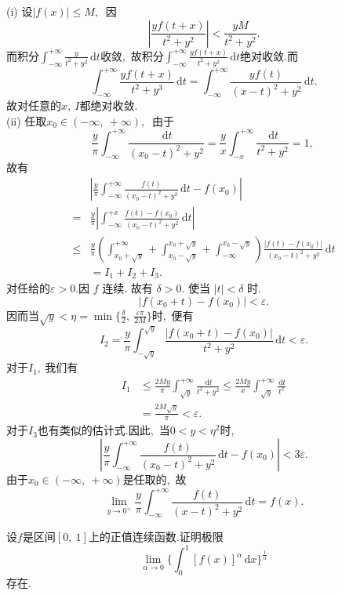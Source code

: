 	\begin{solution}
		(i) 设$  |f(x)| \leqslant M ,\ $ 因
		$$\left|\frac{y f(t+x)}{t^{2}+y^{2}}\right|<\frac{y M}{t^{2}+y^{2}} .$$
		而积分$\int_{-\infty}^{+\infty}\frac{y}{t^2+y^2}\,\text{d}t$收敛,\ 故积分$\int_{-\infty}^{+\infty}\frac{yf(t+x)}{t^2+y^2}\,\text{d}t$绝对收敛.而
		$$\int_{-\infty}^{+\infty} \frac{y f(t+x)}{t^{2}+y^{3}} \,\text{d} t=\int_{-\infty}^{+\infty} \frac{y f(t)}{(x-t)^{2}+y^{2}} \,\text{d} t .$$
		故对任意的$x,\ I$都绝对收敛.\\
		(ii) 任取$  x_{0} \in(-\infty,\ +\infty) ,\ $ 由于
		$$\frac{y}{\pi} \int_{-\infty}^{+\infty} \frac{\,\text{d} t}{\left(x_{0}-t\right)^{2}+y^{2}}=\frac{y}{x} \int_{-x}^{+\infty} \frac{\,\text{d} t}{t^{2}+y^{2}}=1,\ $$
		故有
		$$\begin{aligned}
			&\left|\frac{y}{\pi} \int_{-\infty}^{+\infty} \frac{f(t)}{\left(x_{0}-t\right)^{2}+y^{2}} \,\text{d} t-        
			f\left(x_{0}\right)\right|\\
			=&\frac{y}{\pi}\left|\int_{-\infty}^{+x} \frac{f(t)-f\left(x_{0}\right)}{\left(x_{0}-t\right)^{2}+y^{2}} \,\text{d} t\right| \\
			\leqslant& \frac{y}{\pi}\left(\int_{x_{0}+\sqrt{y}}^{+\infty}+\int_{x_{0}-\sqrt{y}}^{x_{0}+\sqrt{y}}+\int_{-\infty}^{x_{0}-\sqrt{y}}\right) \frac{\left|f(t)-f\left(x_{0}\right)\right|}{\left(x_{0}-t\right)^{2}+y^{2}} \,\text{d} t \\
			&=I_{1}+I_{2}+I_{3} .
		\end{aligned}$$
		对任给的$  \varepsilon>0 . $因 $ f $ 连续. 故有  $\delta>0 .$ 使当  $|t|<\delta $ 时.
		$$\left|f\left(x_{0}+t\right)-f\left(x_{0}\right)\right|<\varepsilon .$$
		因而当$\sqrt{y}<\eta=\min\{\frac{\delta}{2},\ \frac{\varepsilon\pi}{2M}\}$时,\ 便有
		$$I_{2}=\frac{y}{\pi} \int_{-\sqrt{y}}^{\sqrt{y}} \frac{\left|f\left(x_{0}+t\right)-f\left(x_{0}\right)\right|}{t^{2}+y^{2}} \,\text{d} t<\varepsilon .$$
		对于$  I_{1} ,\  $我们有
		$$\begin{aligned}
			I_{1} & \leqslant \frac{2 M y}{\pi} \int_{\sqrt{y}}^{+\infty} \frac{\,\text{d} t}{t^{2}+y^{2}} \leqslant \frac{2 M y}{x} \int_{\sqrt{y}}^{+\infty} \frac{\,\text{d} t}{t^{2}} \\
			&=\frac{2 M \sqrt{y}}{\pi}<\varepsilon .
		\end{aligned}$$
		对于$I_3$也有类似的估计式.因此,\ 当$0<y<\eta^2$时,\ 
		$$\left|\frac{y}{\pi}\int_{-\infty}^{+\infty}\frac{f(t)}{(x_0-t)^2+y^2}\,\text{d}t-f(x_0)\right|<3\varepsilon.$$
		由于$x_0\in\left(-\infty,\ +\infty\right)$是任取的,\ 故
		$$\lim\limits_{y \rightarrow 0^+} \frac{y}{\pi} \int_{-\infty}^{+\infty} \frac{f(t)}{(x-t)^{2}+y^{2}} \,\text{d} t=f(x).$$ 
	\end{solution} 
	\newpage
	\begin{problem}
		设$f$是区间$[0,\ 1]$上的正值连续函数.证明极限$$\lim\limits_{\alpha\rightarrow0}\{\int_{0}^{1}\left[f(x)\right]^\alpha\,\text{d}x\}^{\frac{1}{\alpha}}$$存在.
	\end{problem}
	
